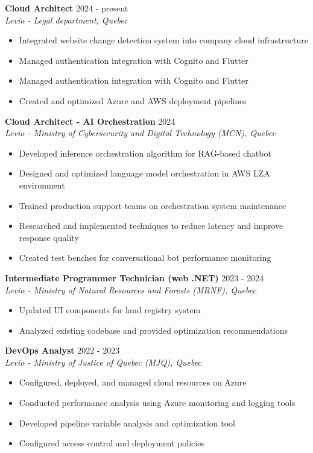 ﻿\documentclass[11pt,letterpaper]{article}
\begin{document}
\textbf{Cloud Architect} \hfill 2024 - present\\
\textit{Levio - Legal department, Quebec}
\begin{itemize}
\item Integrated website change detection system into company cloud infrastructure
\item Managed authentication integration with Cognito and Flutter
\item Managed authentication integration with Cognito and Flutter
\item Created and optimized Azure and AWS deployment pipelines
\end{itemize}

\textbf{Cloud Architect - AI Orchestration} \hfill 2024\\
\textit{Levio - Ministry of Cybersecurity and Digital Technology (MCN), Quebec}
\begin{itemize}
\item Developed inference orchestration algorithm for RAG-based chatbot
\item Designed and optimized language model orchestration in AWS LZA environment
\item Trained production support teams on orchestration system maintenance
\item Researched and implemented techniques to reduce latency and improve response quality
\item Created test benches for conversational bot performance monitoring
\end{itemize}

\textbf{Intermediate Programmer Technician (web .NET)} \hfill 2023 - 2024\\
\textit{Levio - Ministry of Natural Resources and Forests (MRNF), Quebec}
\begin{itemize}
\item Updated UI components for land registry system
\item Analyzed existing codebase and provided optimization recommendations
\end{itemize}

\textbf{DevOps Analyst} \hfill 2022 - 2023\\
\textit{Levio - Ministry of Justice of Quebec (MJQ), Quebec}
\begin{itemize}
\item Configured, deployed, and managed cloud resources on Azure
\item Conducted performance analysis using Azure monitoring and logging tools
\item Developed pipeline variable analysis and optimization tool
\item Configured access control and deployment policies
\end{itemize}
\end{document}
